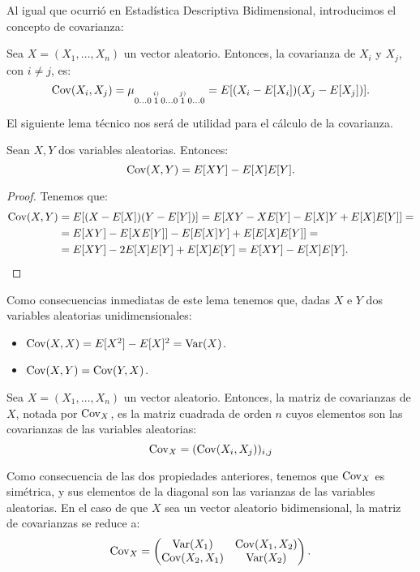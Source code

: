 Al igual que ocurrió en Estadística Descriptiva Bidimensional, introducimos el concepto de covarianza:
\begin{definicion}[Covarianza]
    Sea $X=(X_1,\dots,X_n)$ un vector aleatorio. Entonces, la covarianza de $X_i$ y $X_j$, con $i\neq j$, es:
    \begin{equation*}
        \operatorname{Cov}(X_i,X_j) = \mu_{0 \dots 0 \, \overset{i)}{1} \, 0 \dots 0 \, \overset{j)}{1} \, 0 \dots 0} = E[(X_i-E[X_i])(X_j-E[X_j])].
    \end{equation*}
\end{definicion}
El siguiente lema técnico nos será de utilidad para el cálculo de la covarianza.
\begin{lema}
    Sean $X,Y$ dos variables aleatorias. Entonces:
    \begin{equation*}
        \operatorname{Cov}(X,Y) = E[XY] - E[X]E[Y].
    \end{equation*}
\end{lema}
\begin{proof}
    Tenemos que:
    \begin{align*}
        \operatorname{Cov}(X,Y) &= E[(X-E[X])(Y-E[Y])] = E[XY - XE[Y] - E[X]Y + E[X]E[Y]] =\\
        &= E[XY] - E[XE[Y]] - E[E[X]Y] + E[E[X]E[Y]] =\\
        &= E[XY] - 2E[X]E[Y] + E[X]E[Y] = E[XY] - E[X]E[Y].
    \end{align*}
\end{proof}

Como consecuencias inmediatas de este lema tenemos que, dadas $X$ e $Y$ dos variables aleatorias unidimensionales:
\begin{itemize}
    \item $\operatorname{Cov}(X,X) = E[X^2] - E[X]^2 = \operatorname{Var}(X)$.
    \item $\operatorname{Cov}(X,Y) = \operatorname{Cov}(Y,X)$.
\end{itemize}

\begin{definicion}
    Sea $X=(X_1,\dots,X_n)$ un vector aleatorio. Entonces, la matriz de covarianzas de $X$, notada por $\operatorname{Cov}_X$, es la matriz cuadrada de orden $n$ cuyos elementos son las covarianzas de las variables aleatorias:
    \begin{equation*}
        \operatorname{Cov}_X = (\operatorname{Cov}(X_i,X_j))_{i,j}
    \end{equation*}
\end{definicion}
Como consecuencia de las dos propiedades anteriores, tenemos que $\operatorname{Cov}_X$ es simétrica, y sus elementos de la diagonal son las varianzas de las variables aleatorias. En el caso de que $X$ sea un vector aleatorio bidimensional, la matriz de covarianzas se reduce a:
\begin{equation*}
    \operatorname{Cov}_X = \begin{pmatrix}
        \operatorname{Var}(X_1) & \operatorname{Cov}(X_1,X_2)\\
        \operatorname{Cov}(X_2,X_1) & \operatorname{Var}(X_2)
    \end{pmatrix}.
\end{equation*}

